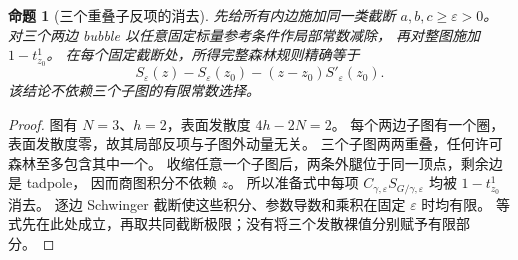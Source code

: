 \documentclass[11pt,a4paper]{ctexart}
\theoremstyle{cnplain}
\newtheorem{proposition}[theorem]{命题}
\theoremstyle{remark}\newtheorem{remark}[theorem]{注}
\begin{document}
\begin{proposition}[三个重叠子反项的消去]\label{prop:forest}
先给所有内边施加同一类截断 $a,b,c\geq\varepsilon>0$。
对三个两边 bubble 以任意固定标量参考条件作局部常数减除，
再对整图施加 $1-t_{z_0}^1$。
在每个固定截断处，所得完整森林规则精确等于
\begin{equation}\label{eq:regulated}
 S_\varepsilon(z)-S_\varepsilon(z_0)
          -(z-z_0)S'_\varepsilon(z_0).
\end{equation}
该结论不依赖三个子图的有限常数选择。
\end{proposition}
\begin{proof}
图有 $N=3$、$h=2$，表面发散度 $4h-2N=2$。
每个两边子图有一个圈，表面发散度零，故其局部反项与子图外动量无关。
三个子图两两重叠，任何许可森林至多包含其中一个。
收缩任意一个子图后，两条外腿位于同一顶点，剩余边是 tadpole，
因而商图积分不依赖 $z$。
所以准备式中每项 $C_{\gamma,\varepsilon}S_{G/\gamma,\varepsilon}$
均被 $1-t_{z_0}^1$ 消去。
逐边 Schwinger 截断使这些积分、参数导数和乘积在固定 $\varepsilon$ 时均有限。
等式先在此处成立，再取共同截断极限；没有将三个发散裸值分别赋予有限部分。
\end{proof}
\end{document}
